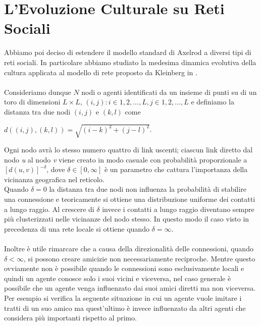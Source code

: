 \documentclass[a4paper,12pt]{article}
\begin{document}
\section{L'Evoluzione Culturale su Reti Sociali}
Abbiamo poi deciso di estendere il modello standard di Axelrod a diversi tipi di reti sociali. In particolare abbiamo studiato la medesima dinamica evolutiva della cultura applicata al modello di rete proposto da Kleinberg in \cite{Kleinberg}.
\\ \\Consideriamo dunque $N$ nodi o agenti identificati da un insieme di punti su di un toro di dimensioni $L \times L$, ${(i,j) : i \in {1,2,\dots,L}, j \in {1,2,\dots,L}}$ e definiamo la distanza tra due nodi $(i,j)$ e $(k,l)$ come 
\begin{center}
$d((i,j),(k,l)) = \sqrt{(i-k)^2+(j-l)^2}$.
\end{center}
Ogni nodo avr\`{a} lo stesso numero quattro di link uscenti; ciascun link diretto dal nodo \textit{u} al nodo \textit{v} viene creato in modo 
casuale con probabilit\`{a} proporzionale a $[d(u,v)]^{-\delta}$, dove $\delta\in [0,\infty]$ \`{e} un parametro che cattura l'importanza della vicinanza geografica nel reticolo. \\
Quando $\delta = 0$ la distanza tra due nodi non influenza la probabilit\`a di stabilire una connessione e teoricamente si ottiene una distribuzione uniforme dei contatti a lungo raggio. 
Al crescere di $\delta$ invece i contatti a lungo raggio diventano sempre pi\`{u} clusterizzati nelle vicinanze del nodo stesso. In questo modo il caso visto in precedenza di una rete locale si ottiene quando $\delta = \infty$.
\\ \\Inoltre \`e utile rimarcare che a causa della direzionalit\`a delle connessioni, quando $\delta<\infty$, si possono creare amicizie non necessariamente reciproche. Mentre questo ovviamente non \`e possibile quando le connessioni sono esclusivamente locali e quindi un agente conosce solo i suoi vicini e viceversa, nel caso generale \`e possibile che un agente venga influenzato dai suoi amici diretti ma non viceversa. Per esempio si verifica la seguente situazione in cui un agente vuole imitare i tratti di un suo amico ma quest'ultimo \`e invece influenzato da altri agenti che considera pi\`u importanti rispetto al primo. \\	
\end{document}

